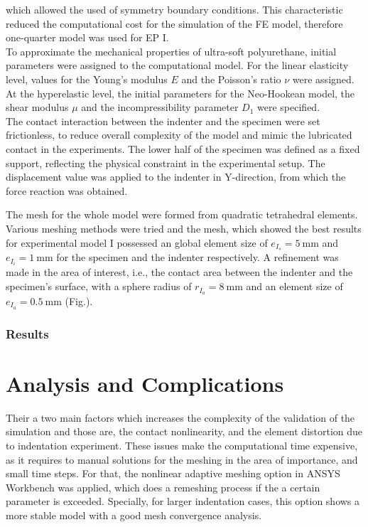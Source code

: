 which allowed the used 
of symmetry boundary conditions. This characteristic reduced the computational cost for the simulation 
of the FE model, therefore one-quarter model was used for EP I.\\

To approximate the mechanical properties of ultra-soft polyurethane, initial parameters were assigned 
to the computational model. For the linear elasticity level, values for the Young's modulus $E$ and the 
Poisson's ratio $\nu$ were assigned. At the hyperelastic level, the initial parameters for the Neo-Hookean model, 
the shear modulus $\mu$ and the incompressibility parameter $D_1$ were specified.\\ 

The contact interaction between the indenter and the specimen were set frictionless, to reduce 
overall complexity of the model and mimic the lubricated contact in the experiments.
The lower half of the specimen was defined as a fixed support, reflecting the physical constraint in the 
experimental setup. The displacement value was applied to the indenter in Y-direction, 
from which the force reaction was obtained.

The mesh for the whole model were formed from quadratic tetrahedral elements. 
Various meshing methods were tried and the mesh, which showed the best results for experimental model I 
possessed an global element size of $e_{I_s}=\SI{5}{\milli\meter}$ and $e_{I_i}=\SI{1}{\milli\meter}$ for the specimen 
and the indenter respectively. A refinement was made in the area of interest, i.e., the contact 
area between the indenter and the specimen's surface, with a sphere radius of 
$r_{I_a}=\SI{8}{\milli\meter}$ and an element size of $e_{I_a}=\SI{0.5}{\milli\meter}$ (Fig.). %

\subsubsection*{Results}

\section{Analysis and Complications}
Their a two main factors which increases the complexity of the validation of the simulation
and those are, the contact nonlinearity, and the element distortion due to indentation
 experiment. These issues make the computational time expensive, as it requires to manual 
 solutions for the meshing in the area of importance, and small time steps. 
 For that, 
 the nonlinear adaptive meshing option in ANSYS Workbench was applied, which does a remeshing
 process if the a certain parameter is exceeded.%
Specially, for larger indentation cases, this option shows a more stable model with a 
good mesh convergence analysis.

